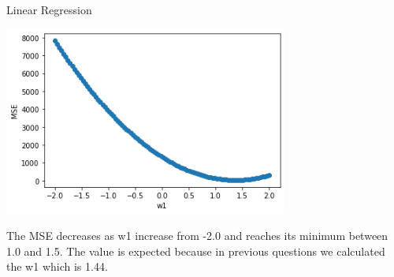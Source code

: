 \documentclass[12pt]{article}
\begin{document}
\begin{question}{Linear Regression}
\begin{subquestion}
\begin{answerbox}{35em}
\begin{center}
\includegraphics[width =0.7\textwidth]{MSE.png}
\end{center}
The MSE decreases as w1 increase from -2.0 and reaches its minimum between 1.0 and 1.5. The value is expected because in previous questions we calculated the w1 which is 1.44.
\end{answerbox}



\end{subquestion}



 
\end{question}
\end{document}
